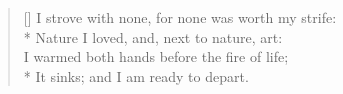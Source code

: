 \documentclass[MAIN]{subfiles}
\begin{document}
\settowidth{\versewidth}{I strove with none, for none was worth my strife:}
\begin{verse}[\versewidth]
I strove with none, for none was worth my strife:\\*
\vin Nature I loved, and, next to nature, art:\\
I warmed both hands before the fire of life;\\*
\vin It sinks; and I am ready to depart.
\end{verse}
\end{document}
